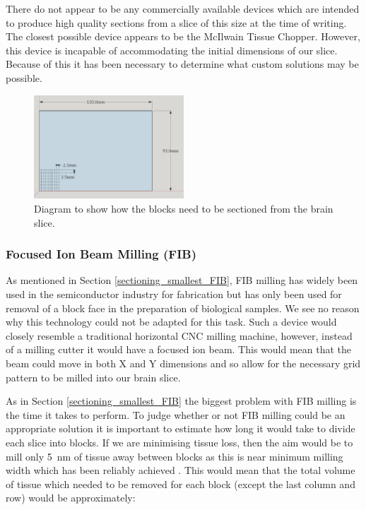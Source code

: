 \documentclass[a4paper, 11pt]{article}
\numberwithin{equation}{section}
\begin{document}
	There do not appear to be any commercially available devices which are intended to produce high quality sections from a slice of this size at the time of writing. The closest possible device appears to be the McIlwain Tissue Chopper. However, this device is incapable of accommodating the initial dimensions of our slice. Because of this it has been necessary to determine what custom solutions may be possible.
	
	\begin{figure}[!h]
		\centering
		\includegraphics[width=0.5\textwidth]{brainslice}
		\caption{Diagram to show how the blocks need to be sectioned from the brain slice.}
		\label{brainslice_diagram}
	\end{figure}
	\subsubsection{Focused Ion Beam Milling (FIB)}
	\label{sectioning_smaller_FIB}
	
	As mentioned in Section \ref{sectioning_smallest_FIB}, FIB milling has widely been used in the semiconductor industry for fabrication but has only been used for removal of a block face in the preparation of biological samples. We see no reason why this technology could not be adapted for this task. Such a device would closely resemble a traditional horizontal CNC milling machine, however, instead of a milling cutter it would have a focused ion beam. This would mean that the beam could move in both X and Y dimensions and so allow for the necessary grid pattern to be milled into our brain slice.
	
	As in Section \ref{sectioning_smallest_FIB} the biggest problem with FIB milling is the time it takes to perform. To judge whether or not FIB milling could be an appropriate solution it is important to estimate how long it would take to divide each slice into blocks. If we are minimising tissue loss, then the aim would be to mill only \SI{5}{\nano\meter} of tissue away between blocks as this is near minimum milling width which has been reliably achieved \cite{knott2008serial}. This would mean that the total volume of tissue which needed to be removed for each block (except the last column and row) would be approximately:
	
\end{document}
